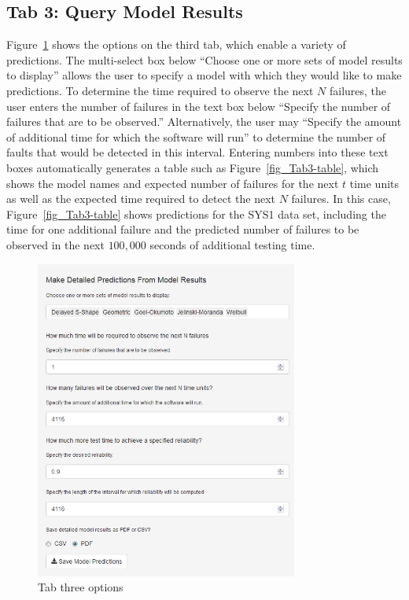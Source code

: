 \documentclass[conference]{IEEEtran}
\begin{document}
\subsection{Tab 3: Query Model Results}\label{tab3}
Figure~\ref{fig_Tab3} shows the options on the third tab, which enable a variety of predictions. The multi-select box below ``Choose one or more sets of model results to display'' allows the user to specify a model with which they would like to make predictions. To determine the time required to observe the next $N$ failures, the user enters the number of failures in the text box below ``Specify the number of failures that are to be observed.''  Alternatively, the user may ``Specify the amount of additional time for which the software will run'' to determine the number of faults that would be detected in this interval. Entering numbers into these text boxes automatically generates a table such as Figure~\ref{fig_Tab3-table}, which shows the model names and expected number of failures for the next $t$ time units as well as the expected time required to detect the next $N$ failures. In this case, Figure~\ref{fig_Tab3-table} shows predictions for the SYS1 data set, including the time for one additional failure and the predicted number of failures to be observed in the next $100,000$ seconds of additional testing time.

\begin{figure}[!h]
\centering
\includegraphics[width=3.4in]{Figures/Fig13}
\caption{Tab three options}
\label{fig_Tab3}
\end{figure}
\end{document}
